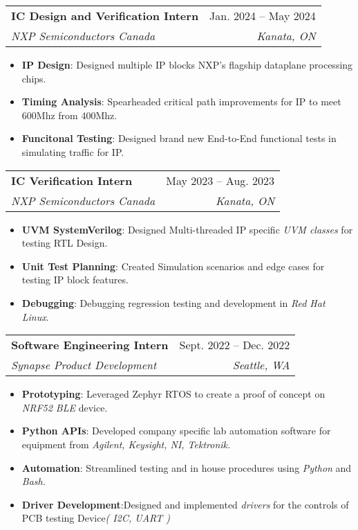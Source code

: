 \documentclass[letterpaper,11pt]{article}
\makeatletter
\newcommand{\resumeItem}[1]{
  \item\small{
    {#1 \vspace{-2pt}}
  }
}
\newcommand{\resumeSubheading}[4]{
  \vspace{-1pt}\item
    \begin{tabular*}{0.97\textwidth}[t]{l@{\extracolsep{\fill}}r}
      \textbf{#1} & #2 \\
      \textit{\small#3} & \textit{\small #4} \\
    \end{tabular*}\vspace{-7pt}
}
\newcommand{\resumeSubSubheading}[2]{
    \item
    \begin{tabular*}{0.97\textwidth}{l@{\extracolsep{\fill}}r}
      \textit{\small#1} & \textit{\small #2} \\
    \end{tabular*}\vspace{-7pt}
}
\newcommand{\resumeSubHeadingListEnd}{\end{itemize}}
\newcommand{\resumeItemListStart}{\begin{itemize}}
\newcommand{\resumeItemListEnd}{\end{itemize}\vspace{-5pt}}
\makeatother
\begin{document}
    \resumeSubheading
      {IC Design and Verification Intern}{Jan. 2024 -- May 2024}
      {NXP Semiconductors Canada}{Kanata, ON}
      \resumeItemListStart
      \resumeItem {\textbf{IP Design}: Designed multiple IP blocks NXP's flagship dataplane processing chips.} 
      \resumeItem {\textbf{Timing Analysis}: Spearheaded critical path improvements for IP to meet 600Mhz from 400Mhz.} 
      \resumeItem {\textbf{Funcitonal Testing}: Designed brand new End-to-End functional tests in simulating traffic for IP.}
      \resumeItemListEnd
     \resumeSubheading
      {IC Verification Intern}{May 2023 -- Aug. 2023}
      {NXP Semiconductors Canada}{Kanata, ON}
      \resumeItemListStart
      \resumeItem {\textbf{UVM SystemVerilog}: Designed Multi-threaded IP specific \emph{UVM classes} for testing RTL Design.} 
      \resumeItem {\textbf{Unit Test Planning}: Created Simulation scenarios and edge cases for testing IP block features.} 
      \resumeItem {\textbf{Debugging}: Debugging regression testing and development in \emph{Red Hat Linux}.} 
      \resumeItemListEnd
    
    \resumeSubheading
      {Software Engineering Intern}{Sept. 2022 -- Dec. 2022}
      {Synapse Product Development}{Seattle, WA}
      \resumeItemListStart
        \resumeItem {\textbf{Prototyping}: Leveraged {Zephyr RTOS} to create a proof of concept on \textit{NRF52 BLE} device.}
        \resumeItem {\textbf{Python APIs}: Developed company specific lab automation software for equipment from \textit{Agilent, Keysight, NI, Tektronik.}}
        \resumeItem {\textbf{Automation}: Streamlined testing and in house procedures using \textit{Python} and \textit{Bash.}} 
        \resumeItem {\textbf{Driver Development}:Designed and implemented \textit{drivers} for the controls of PCB testing Device\textit{( I2C, UART )}}
      \resumeItemListEnd
     
\end{document}
